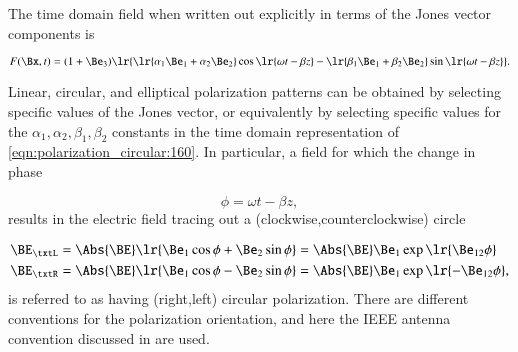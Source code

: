 %
%


The time domain field when written out explicitly in terms of the Jones vector components is

\begin{dmath}\label{eqn:polarization_circular:160}
F(\Bx, t) = (1 + \Be_3) \lr{
\lr{ \alpha_1 \Be_1 + \alpha_2 \Be_2 } \cos\lr{ \omega t - \beta z }
-\lr{ \beta_1 \Be_1 + \beta_2 \Be_2 } \sin\lr{ \omega t - \beta z }
}.
\end{dmath}

Linear, circular, and elliptical polarization patterns can be obtained by selecting specific values of the Jones vector, or equivalently by selecting specific values for the \( \alpha_1, \alpha_2, \beta_1, \beta_2 \) constants in the time domain representation of \cref{eqn:polarization_circular:160}.
In particular,
a field for which the
change in phase

\begin{dmath}\label{eqn:polarization_circular:520}
\phi = \omega t - \beta z,
\end{dmath}
results in the electric field tracing out a (clockwise,counterclockwise) circle

\begin{dmath}\label{eqn:polarization_circular:180}
\begin{aligned}
\BE_\txtL &= \Abs{\BE} \lr{ \Be_1 \cos\phi + \Be_2 \sin\phi } = \Abs{\BE} \Be_1 \exp\lr{  \Be_{12} \phi } \\
\BE_\txtR &= \Abs{\BE} \lr{ \Be_1 \cos\phi - \Be_2 \sin\phi } = \Abs{\BE} \Be_1 \exp\lr{ -\Be_{12} \phi },
\end{aligned}
\end{dmath}
is referred to as having
(right,left) circular polarization.
There are different conventions for the polarization orientation, and here the IEEE antenna convention discussed in \citep{balanis1989advanced} are used.


